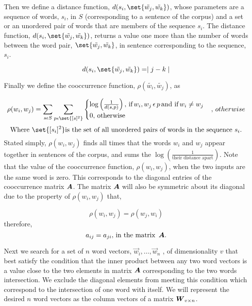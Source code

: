\documentclass{article}
\begin{document}
Then we define a distance function, $d(s_i, \set{\tilde{w_j}, \tilde{w_k}})$, whose parameters are a sequence of words, $s_i$, in $S$ (corresponding to a sentence of the corpus) and a set or an unordered pair of words that are members of the sequence $s_i$. The distance function, $d(s_i, \set{\tilde{w_j}, \tilde{w_k}})$, returns a value one more than the number of words between the word pair, $\set{\tilde{w_j}, \tilde{w_k}}$, in sentence corresponding to the sequence, $s_i$.

\begin{equation*}
d(s_i, \set{\tilde{w_j}, \tilde{w_k}}) = \mid j - k \mid
\end{equation*}

Finally we define the cooccurrence function, $\rho(\tilde{w_i}, \tilde{w_j})$, as

\begin{equation*}
\rho(w_i,w_j) = 
\sum_{s \epsilon S} { \sum_{p \epsilon \set{[s]^2} } {
\begin{cases}
\log \left(\frac{1}{d(s,p)} \right), \, \text{if} \, w_i, w_j \, \epsilon \, p \, \text{and if} \, w_i \neq w_j
\\
0, \, \text{otherwise}
\end{cases}
} }, \, otherwise
\end{equation*}
\begin{equation*}
\text{Where } \set{[s_i]^2} \text{is the set of all unordered pairs of words in the sequence } s_i . 
\end{equation*}
Stated simply, $\rho(w_i, w_j)$ finds all times that the words $w_i$ and $w_j$ appear together in sentences of the corpus, and sums the $\log \left( \frac{1}{\text{their distance apart}} \right)$. Note that the value of the cooccurrence function, $\rho(w_i, w_j)$, when the two inputs are the same word is zero. This corresponds to the diagonal entries of the cooccurrence matrix $\boldsymbol{A}$. The matrix $\boldsymbol{A}$ will also be symmetric about its diagonal due to the property of $\rho(w_i, w_j)$ that,

\begin{equation*}
\rho(w_i,w_j) = \rho(w_j,w_i)
\end{equation*}
therefore,
\begin{equation*}
a_{ij} = a_{ji}, \, \text{in the matrix } \, \boldsymbol{A}.
\end{equation*}


Next we search for a set of $n$ word vectors, $\vec{w}_{i},\ldots ,\vec{w}_{n}$ , of dimensionality $v$ that best satisfy the condition that the inner product between any two word vectors is a value close to the two elements in matrix $\boldsymbol{A}$ corresponding to the two words intersection. We exclude the diagonal elements from meeting this condition which correspond to the intersection of one word with itself. We will represent the desired $n$ word vectors as the column vectors of a matrix $\boldsymbol{{W}}_{{v} \times {n}}$.
\end{document}
